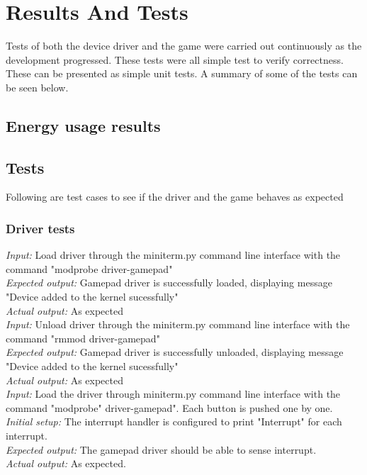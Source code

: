\section{Results And Tests}
Tests of both the device driver and the game were carried out continuously as the development progressed. These tests were all simple test to verify correctness. These can be presented as simple unit tests. A summary of some of the tests can be seen below.

\subsection{Energy usage results}








\subsection{Tests}

Following are test cases to see if the driver and the game behaves as expected

\subsubsection{Driver tests}

\emph{Input: } Load driver through the miniterm.py command line interface with the command "modprobe driver-gamepad"\\
\emph{Expected output: } Gamepad driver is successfully loaded, displaying message "Device added to the kernel sucessfully"\\
\emph{Actual output: } As expected\\

\emph{Input: } Unload driver through the miniterm.py command line interface with the command "rmmod driver-gamepad"\\
\emph{Expected output: } Gamepad driver is successfully unloaded, displaying message "Device added to the kernel sucessfully"\\
\emph{Actual output: } As expected\\

\emph{Input: } Load the driver through miniterm.py command line interface with the command "modprobe" driver-gamepad". Each button is pushed one by one.\\
\emph{Initial setup: } The interrupt handler is configured to print "Interrupt" for each interrupt.\\
\emph{Expected output: } The gamepad driver should be able to sense interrupt.\\
\emph{Actual output: } As expected. \\ 

